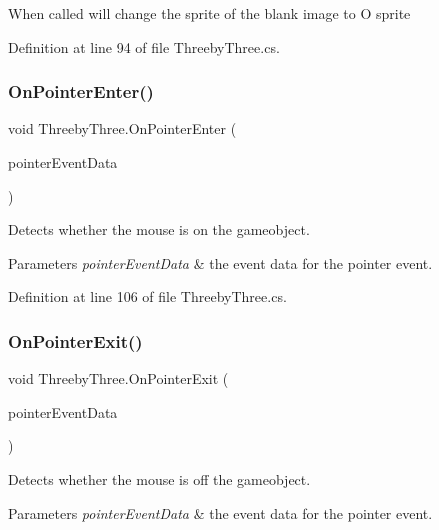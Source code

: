 When called will change the sprite of the blank image to O sprite 

Definition at line 94 of file Threeby\+Three.\+cs.

\mbox{\label{class_threeby_three_a0dc2a10fd5dc7956260a7396eb54a4a6}} 
\subsubsection{\texorpdfstring{OnPointerEnter()}{OnPointerEnter()}}
{\footnotesize\ttfamily void Threeby\+Three.\+On\+Pointer\+Enter (\begin{DoxyParamCaption}\item[{Pointer\+Event\+Data}]{pointer\+Event\+Data }\end{DoxyParamCaption})}

Detects whether the mouse is on the gameobject. 
\begin{DoxyParams}{Parameters}
{\em pointer\+Event\+Data} & the event data for the pointer event. \\
\hline
\end{DoxyParams}


Definition at line 106 of file Threeby\+Three.\+cs.

\mbox{\label{class_threeby_three_afb2d068718caafc00d06d5bf87f07692}} 
\subsubsection{\texorpdfstring{OnPointerExit()}{OnPointerExit()}}
{\footnotesize\ttfamily void Threeby\+Three.\+On\+Pointer\+Exit (\begin{DoxyParamCaption}\item[{Pointer\+Event\+Data}]{pointer\+Event\+Data }\end{DoxyParamCaption})}

Detects whether the mouse is off the gameobject. 
\begin{DoxyParams}{Parameters}
{\em pointer\+Event\+Data} & the event data for the pointer event. \\
\hline
\end{DoxyParams}



